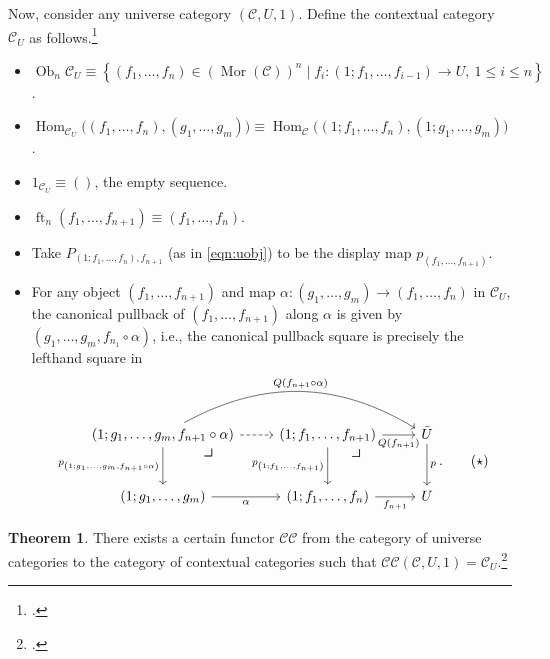 \documentclass[10pt,letterpaper,cm]{nupset}
\theoremstyle{definition}
\theoremstyle{theorem}
\newtheorem{theorem}[definition]{Theorem}
\theoremstyle{remark}
\DeclareMathOperator{\ft}{ft}
\DeclareMathOperator{\ob}{Ob}
\DeclareMathOperator{\mor}{Mor}
\newcommand{\0}{\mathbf{0}}
\newcommand{\1}{\mathbf{1}}
\newcommand{\2}{\mathbf{2}}
\renewcommand{\c}{\mathscr{C}}
\DeclareMathOperator{\Hom}{Hom}
\newcommand{\bi}{\begin{itemize}}
\newcommand{\ei}{\end{itemize}}
\begin{document}
Now, consider any universe category $\left(\c, U, 1\right)$. Define the contextual category $\c_U$ as follows.\label{indcxtcat}\footnote{\cite[Definition 1.3.2]{KL}.}
\bi
\item $\ob_n{\c_U} \equiv \left\{\left(f_1, \ldots, f_n\right) \in \left(\mor(\c)\right)^n \mid f_i : \left(1; f_1, \ldots, f_{i-1}\right) \to U, \ 1 \leq i \leq n \right\}$.
\item $\Hom_{\c_{U}}\big(\left(f_1, \ldots, f_n\right), \left(g_1, \ldots, g_m\right)\big) \equiv \Hom_{\c}\big(\left(1; f_1, \ldots, f_n\right), \left(1; g_1, \ldots, g_m\right)    \big)$.
\item $1_{\c_U}\equiv \left({}\right)$, the empty sequence.
\item $\ft_n(f_1, \ldots, f_{n+1}) \equiv \left(f_1, \ldots, f_n\right)$.
\item Take $P_{\left(1; f_1, \ldots, f_n\right), f_{n+1}}$ (as in \eqref{eqn:uobj}) to be the display map $p_{\left(f_1, \ldots, f_{n+1}\right)}$.
\item For any object $\left(f_1, \ldots, f_{n+1}\right)$ and map $\alpha : \left(g_1, \ldots, g_m\right) \to \left(f_1, \ldots, f_n\right)$ in $\c_{U}$, the canonical pullback of $\left(f_1, \ldots, f_{n+1}\right)$ along $\alpha$ is given by $\left(g_1, \ldots, g_m, f_{n_1}\circ \alpha \right)$, i.e., the canonical pullback square is precisely the lefthand square in
\[
\label{eqn:CU} \begin{tikzcd}[row sep=large]
{\left(1; g_1, \ldots, g_m, f_{n+1} \circ \alpha\right)} \arrow[rr, "Q(f_{n+1}\circ \alpha)", bend left] \arrow[r, dashed] \arrow[d, "{p_{\left(1; g_1, \ldots, g_m, f_{n+1} \circ \alpha\right)}}"']  \arrow[dr, phantom, "\scalebox{1.5}{\color{black}$\lrcorner$}", very near start] & {\left(1; f_1, \ldots, f_{n+1}\right)} \arrow[r, "Q(f_{n+1})"'] \arrow[d, "{p_{\left(1; f_1, \ldots, f_{n+1}\right)}}"']  \arrow[dr, phantom, "\scalebox{1.5}{\color{black}$\lrcorner$}", very near start] & \tilde{U} \arrow[d, "p"] \\
{\left(1; g_1, \ldots, g_m\right)} \arrow[r, "\alpha"']                                                                                                                                               & {\left(1; f_1, \ldots, f_{n}\right)} \arrow[r, "f_{n+1}"']                                                              & U                       
\end{tikzcd}. \tag{$\star$}
\]
\ei



\begin{theorem}\label{C-U}
There exists a certain functor $\mathcal{CC}$ from the category of universe categories to the category of contextual categories such that $\mathcal{CC}(\c, U, 1)=\c_U$.\footnote{\autocite[Construction 4.7]{voev}.  }
\end{theorem}
\end{document}
